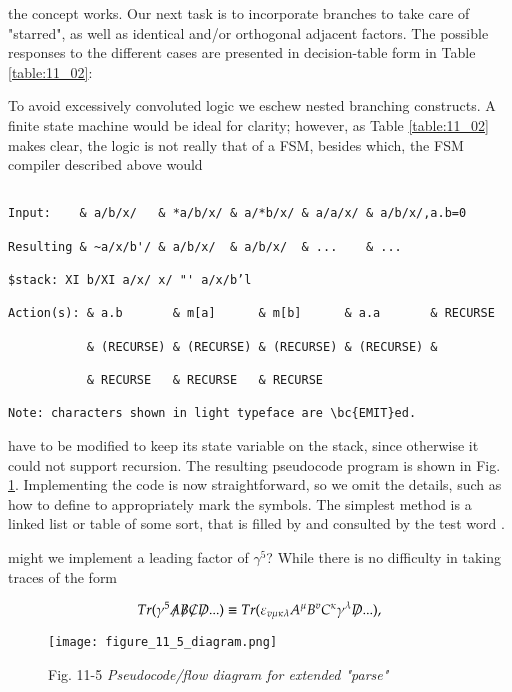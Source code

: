  the concept works. Our next task is to incorporate branches to take care of "starred", as well as identical and/or orthogonal adjacent factors. The possible responses to the different cases are presented in decision-table form in Table \ref{table:11_02}:

To avoid excessively convoluted logic we eschew nested branching constructs. A finite state machine would be ideal for clarity; however, as Table \ref{table:11_02} makes clear, the logic is not really that of a FSM, besides which, the FSM compiler described above would

\begin{verbatim}

Input:    & a/b/x/   & *a/b/x/ & a/*b/x/ & a/a/x/ & a/b/x/,a.b=0

Resulting & ~a/x/b'/ & a/b/x/  & a/b/x/  & ...    & ...

$stack: XI b/XI a/x/ x/ "' a/x/b’l

Action(s): & a.b       & m[a]      & m[b]      & a.a       & RECURSE

           & (RECURSE) & (RECURSE) & (RECURSE) & (RECURSE) &

           & RECURSE   & RECURSE   & RECURSE

Note: characters shown in light typeface are \bc{EMIT}ed.
\end{verbatim}

have to be modified to keep its state variable on the stack, since otherwise it could not support recursion. The resulting pseudocode program is shown in Fig. \ref{fig:11_05}. Implementing the code is now straightforward, so we omit the details, such as how to define  to appropriately mark the symbols. The simplest method is a linked list or table of some sort, that is filled by  and consulted by the test word .


 might we implement a leading factor of $\gamma^{5}$? While there is no difficulty in taking traces of the form

\begin{equation}
Tr( \gamma^{5} \tr{A} \tr{B} \tr{C} \tr{D} ...) \equiv Tr(\varepsilon_{v\mu\kappa\lambda} A^{\mu} B^{v} C^{\kappa} \gamma^{\lambda} \tr{D} ...),
\end{equation}

\begin{figure}
    \texttt{[image: figure\_11\_5\_diagram.png]}
    \caption{Fig. 11-5 \textit{Pseudocode/flow diagram for extended "parse"}}
    \label{fig:11_05}
\end{figure}

